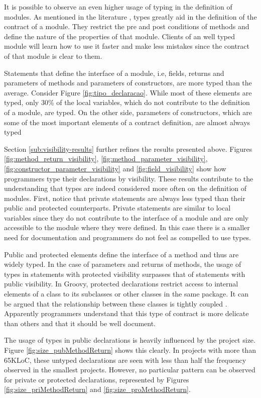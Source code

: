 \documentclass[preprint]{sigplanconf}
\begin{document}
It is possible to observe an even higher usage of typing in the definition of modules.
As mentioned in the literature \cite{Meyer88, Meijer04, Wadler04, Plosch97, Flanagan2006, Furr09}, types greatly aid in the definition of the contract of a module.
They restrict the pre and post conditions of methods and define the nature of the properties of that module.
Clients of an well typed module will learn how to use it faster and make less mistakes since the contract of that module is clear to them.

Statements that define the interface of a module, i.e, fields, returns and parameters of methods and parameters of constructors, are more typed than the average.
Consider Figure \ref{fig:tipo_declaracao}.
While most of these elements are typed, only 30\%  of the local variables, which do not contribute to the definition of a module, are typed. On the other side, parameters of constructors, which are some of the most important elements of a contract definition, are almost always typed

Section \ref{sub:visibility-results} further refines the results presented above.
Figures \ref{fig:method_return_visibility}, \ref{fig:method_parameter_visibility}, \ref{fig:constructor_parameter_visibility} and \ref{fig:field_visibility} show how programmers type their declarations by visibility.
These results contribute to the understanding that types are indeed considered more often on the definition of modules.
First, notice that private statements are always less typed than their public and protected counterparts.
Private statements are similar to local variables since they do not contribute to the interface of a module and are only accessible to the module where they were defined.
In this case there is a smaller need for documentation and programmers do not feel as compelled to use types.

Public and protected elements define the interface of a method and thus are widely typed.
In the case of parameters and returns of methods, the usage of types in statements with protected visibility  surpasses that of statements with public visibility.
In Groovy, protected declarations restrict access to internal elements of a class to its subclasses or other classes in the same package.
It can be argued that the relationship between these classes is tightly coupled \cite{Eder94}.
Apparently programmers understand that this type of contract is more delicate than others and that it should be well document.

The usage of types in public declarations is heavily influenced by the project size.
Figure \ref{fig:size_pubMethodReturn} shows this clearly.
In projects with more than 65KLoC, these untyped declarations are seen with less than half the frequency observed in the smallest projects.
However, no particular pattern can be observed for private or protected declarations, represented by Figures \ref{fig:size_priMethodReturn} and \ref{fig:size_proMethodReturn}.
\end{document}
